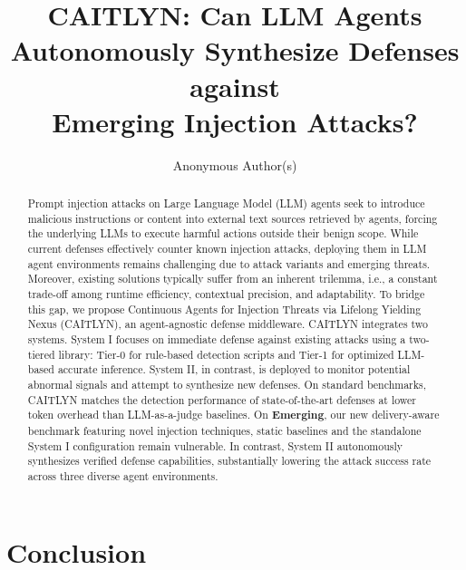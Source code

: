 \documentclass[letterpaper,twocolumn,10pt]{article}
\begin{document}
\date{}

\title{\Large \bf CAITLYN: Can LLM Agents Autonomously Synthesize Defenses
  against\\Emerging Injection Attacks?}

\author{
{\rm Anonymous Author(s)}
}

\maketitle

\begin{abstract}
Prompt injection attacks on Large Language Model (LLM) agents seek to
introduce malicious instructions or content into external text sources
retrieved by agents, forcing the underlying LLMs to execute harmful
actions outside their benign scope.
While current defenses effectively counter known injection attacks,
deploying them in LLM agent environments remains challenging due to
attack variants and emerging threats. Moreover, existing solutions typically
suffer from an inherent trilemma, i.e., a constant trade-off among runtime
efficiency, contextual precision, and adaptability.
To bridge this gap, we propose Continuous Agents for Injection
Threats via Lifelong Yielding Nexus (CAITLYN), an agent-agnostic
defense middleware. CAITLYN integrates two systems. System I focuses
on immediate defense against existing attacks using a two-tiered
library: Tier-0 for rule-based detection scripts and Tier-1 for
optimized LLM-based accurate inference. System II, in contrast, is
deployed to monitor potential abnormal signals and attempt to
synthesize new defenses.
On standard benchmarks, CAITLYN matches the detection performance of
state-of-the-art defenses at lower token overhead than LLM-as-a-judge
baselines. On \textbf{Emerging}, our new delivery-aware benchmark
featuring novel injection techniques, static baselines and the
standalone System I configuration remain vulnerable. In contrast,
System II autonomously synthesizes verified defense capabilities,
substantially lowering the attack success rate across three diverse
agent environments.
\end{abstract}






\section{Conclusion}
\end{document}
